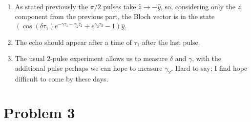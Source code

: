 \documentclass[12pt]{article}
\begin{document}
\begin{enumerate}[label=(\alph*)]
    \item As stated previously the $\pi/2$ pulses take $\hat{z}\to-\hat{y}$, so, considering only the $z$ component from the previous part, the Bloch vector is in the state $\left(\cos(\delta\tau_1)e^{-\gamma\tau_1 - \gamma_2\tau_2} + e^{\gamma_2\tau_2} - 1\right)\hat{y}$.
    \item The echo should appear after a time of $\tau_1$ after the last pulse.
    \item The usual 2-pulse experiment allows us to measure $\delta$ and $\gamma$, with the additional pulse perhaps we can hope to measure $\gamma_2$. Hard to say; I find hope difficult to come by these days.
\end{enumerate}


\section*{Problem 3}
\end{document}
